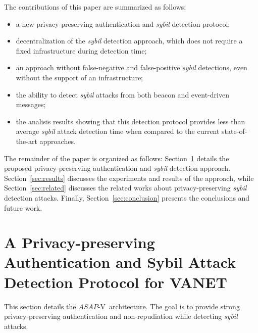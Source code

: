 \documentclass[preprint,12pt]{elsarticle}
\newcommand{\protocolname}{$ASAP$-V}
\begin{document}
The contributions of this paper are summarized as follows:

\begin{itemize}
	\item a new privacy-preserving authentication and \textit{sybil} detection protocol;
	\item decentralization of the \textit{sybil} detection approach, which does not require a fixed infrastructure during detection time;
	\item an approach without false-negative and false-positive \textit{sybil} detections, even without the support of an infrastructure;
	\item the ability to detect \textit{sybil} attacks from both beacon and event-driven messages;
	\item the analisis results showing that this detection protocol provides less than average \textit{sybil} attack detection time when compared to the current state-of-the-art approaches.
\end{itemize}

The remainder of the paper is organized as follows: Section~\ref{sec:solution} details the proposed privacy-preserving authentication and \textit{sybil} detection approach. Section~\ref{sec:results} discusses the experiments and results of the approach, while Section~\ref{sec:related} discusses the related works about privacy-preserving \textit{sybil} detection attacks. Finally, Section~\ref{sec:conclusion} presents the conclusions and future work.

\section{A Privacy-preserving Authentication and Sybil Attack Detection Protocol for VANET}
\label{sec:solution}

This section details the \protocolname~architecture. The goal is to provide strong privacy-preserving authentication and non-repudiation while detecting \textit{sybil} attacks.

%
\end{document}
